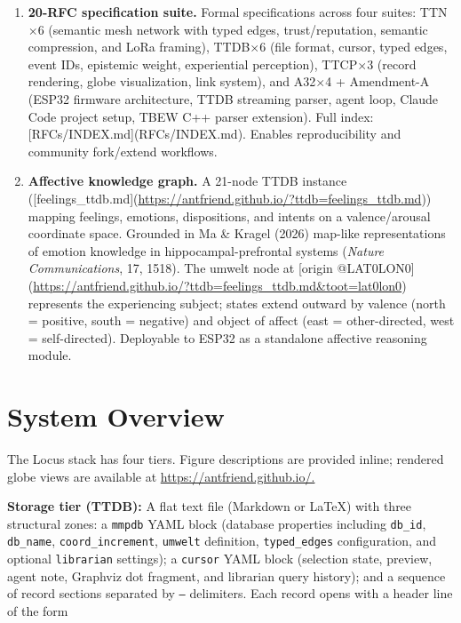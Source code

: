 \documentclass[11pt]{article}
\begin{document}
\begin{enumerate}[leftmargin=*, label=\textbf{\arabic*.}]
\item \textbf{20-RFC specification suite.}
Formal specifications across four suites: TTN$\times$6 (semantic mesh network with typed edges, trust/reputation, semantic compression, and LoRa framing), TTDB$\times$6 (file format, cursor, typed edges, event IDs, epistemic weight, experiential perception), TTCP$\times$3 (record rendering, globe visualization, link system), and A32$\times$4 + Amendment-A (ESP32 firmware architecture, TTDB streaming parser, agent loop, Claude Code project setup, TBEW C++ parser extension). Full index: [RFCs/INDEX.md](RFCs/INDEX.md). Enables reproducibility and community fork/extend workflows.
\item \textbf{Affective knowledge graph.}
A 21-node TTDB instance ([feelings\_ttdb.md](\url{https://antfriend.github.io/?ttdb=feelings_ttdb.md})) mapping feelings, emotions, dispositions, and intents on a valence/arousal coordinate space. Grounded in Ma \& Kragel (2026) map-like representations of emotion knowledge in hippocampal-prefrontal systems (\emph{Nature Communications}, 17, 1518). The umwelt node at [origin @LAT0LON0](\url{https://antfriend.github.io/?ttdb=feelings_ttdb.md&toot=lat0lon0}) represents the experiencing subject; states extend outward by valence (north = positive, south = negative) and object of affect (east = other-directed, west = self-directed). Deployable to ESP32 as a standalone affective reasoning module.

\end{enumerate}



\section{System Overview}


The Locus stack has four tiers. Figure descriptions are provided inline; rendered globe views are available at \url{https://antfriend.github.io/.}

\textbf{Storage tier (TTDB):} A flat text file (Markdown or LaTeX) with three structural zones: a \texttt{mmpdb} YAML block (database properties including \texttt{db\_id}, \texttt{db\_name}, \texttt{coord\_increment}, \texttt{umwelt} definition, \texttt{typed\_edges} configuration, and optional \texttt{librarian} settings); a \texttt{cursor} YAML block (selection state, preview, agent note, Graphviz dot fragment, and librarian query history); and a sequence of record sections separated by \texttt{---} delimiters. Each record opens with a header line of the form
\end{document}
